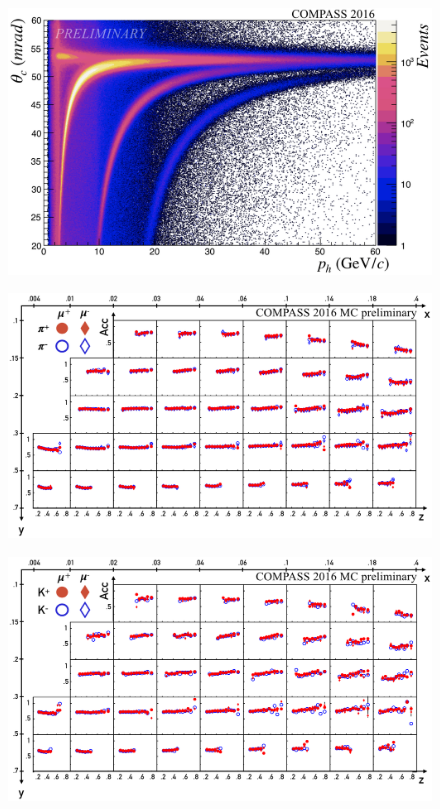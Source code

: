 \documentclass[letterpaper,12pt]{article}
\begin{document}
\begin{figure}[H]
	\centering
	\includegraphics[scale=0.34]{./gfx/RICH.png}
	\caption{}
	\label{RICH}
\end{figure}

\begin{figure}
	\includegraphics[scale=0.5]{./gfx/AccPi.png}
	\caption{}
	\label{AccPi}
\end{figure}

\begin{figure}
	\includegraphics[scale=0.5]{./gfx/AccK.png}
	\caption{}
	\label{AccK}
\end{figure}
\end{document}
